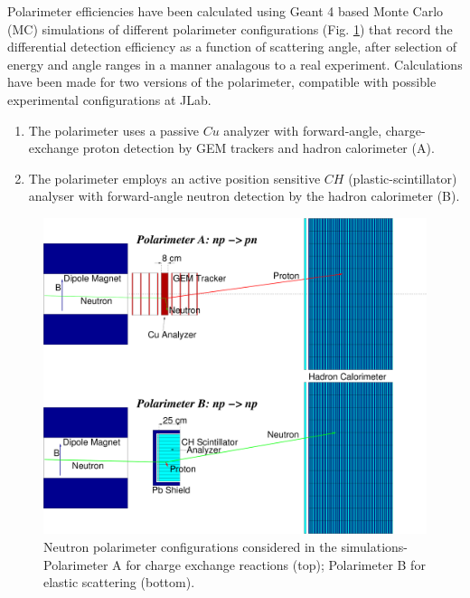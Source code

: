 \documentclass[twocolumn,epjc3]{svjour3}
\begin{document}
Polarimeter efficiencies have been calculated using Geant 4 based Monte Carlo (MC) simulations of different polarimeter configurations (Fig. \ref{fig:FoMPol}) that record the differential detection efficiency as a function of scattering angle, after selection of energy and angle ranges in a manner analagous to a real experiment. Calculations have been made for two versions of the polarimeter, compatible with possible experimental configurations at JLab.
\begin{enumerate}
\item The polarimeter uses a passive $Cu$ analyzer with forward-angle, charge-exchange proton detection by GEM trackers and hadron calorimeter (A).
\item The polarimeter employs an active position sensitive $CH$ (plastic-scintillator) analyser with forward-angle neutron detection by the hadron calorimeter (B).
\end{enumerate}

\begin{figure}
  \centering
  \includegraphics[width=1.00\columnwidth]{fig05_ALPOM_Fig3b.pdf}
  \caption{Neutron polarimeter configurations considered in the simulations- Polarimeter A for charge exchange reactions (top); Polarimeter B for elastic scattering (bottom).}
  \label{fig:FoMPol}
\end{figure}
\end{document}
